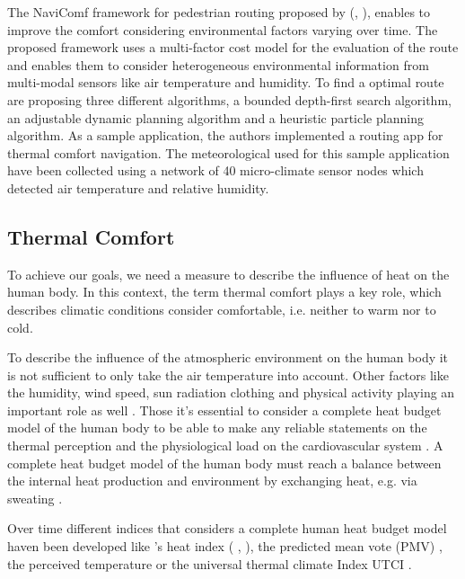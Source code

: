 The NaviComf framework for pedestrian routing proposed by \citeauthor{Dang2012} (\citeyear{Dang2012}, \citeyear{Dang2013}), enables to improve the comfort considering environmental factors varying over time. The proposed framework uses a multi-factor cost model for the evaluation of the route and enables them to consider heterogeneous environmental information from multi-modal
 sensors like air temperature and humidity. To find a optimal route \textcite{Dang2013} are proposing three different algorithms,  a bounded depth-first search algorithm, an adjustable dynamic planning algorithm and a heuristic particle planning algorithm. As a sample application, the authors implemented a routing app for thermal comfort navigation. The meteorological used for this sample application have been collected using a network of 40 micro-climate sensor nodes which detected air temperature and relative humidity. 

\subsection{Thermal Comfort}

To achieve our goals, we need a measure to describe the influence of heat on the human body.  In this context, the term thermal comfort plays a key role, which describes climatic conditions consider comfortable, i.e. neither to warm nor to cold.

To describe the influence of the atmospheric environment on the human body it is not sufficient to only take the air temperature into account. Other factors like the humidity, wind speed, sun radiation clothing and physical activity playing an important role as well \parencite{Staiger2011,Huebler2007}.  Those it's essential to consider a complete heat budget model of the human body to be able to make any reliable statements on the thermal perception and the physiological load on the cardiovascular system \parencite{Staiger1997}. A complete heat budget model of the human body must reach a balance between the internal heat production and environment by exchanging heat, e.g. via sweating \parencite{Staiger2011}. 

Over time different indices that considers a complete human heat budget model haven been developed like \citeauthor{Steadman1979}'s heat index  (\citeauthor{Steadman1979} \citeyear*{Steadman1979}, \citeyear*{Steadman1979a}), the predicted mean vote (PMV) \parencite{Fanger1973}, the perceived temperature \parencite{Staiger1997,Jendritzky2000} or the universal thermal climate Index UTCI \parencite{Jendritzky2010}.

